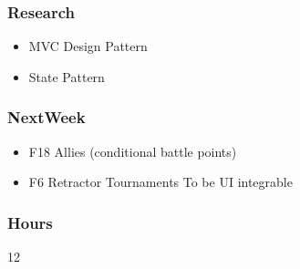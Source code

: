 \documentclass[10pt,a4paper]{article}
\begin{document}
\subsubsection*{Research}
\begin{itemize}
\item MVC Design Pattern
\item State Pattern
\end{itemize}
\subsubsection*{NextWeek}
\begin{itemize}
\item F18 Allies (conditional battle points)
\item F6 Retractor Tournaments To be UI integrable
\end{itemize}
\subsubsection*{Hours}
12
\end{document}
